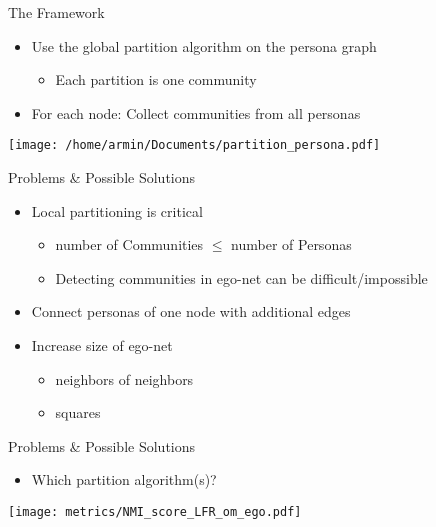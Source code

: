 \documentclass[11pt]{beamer}
\begin{document}
\begin{frame}{The Framework}
	
\begin{itemize}	
	\item Use the global partition algorithm on the persona graph
	\begin{itemize}
		\item Each partition is one community
	\end{itemize}
	\item For each node: Collect communities from all personas
	\end{itemize}
	\vfill
	\centering
	\texttt{[image: /home/armin/Documents/partition\_persona.pdf]}
\end{frame}

\begin{frame}{Problems \& Possible Solutions}
	\begin{itemize}
		\item Local partitioning is critical
		\begin{itemize}
			\item number of Communities $\leq$ number of Personas
			\item Detecting communities in ego-net can be difficult/impossible
		\end{itemize}
	
	\item Connect personas of one node with additional edges
	\item Increase size of ego-net
	\begin{itemize}
		\item neighbors of neighbors
		\item squares
	\end{itemize}
	\end{itemize}
\end{frame}

\begin{frame}{Problems \& Possible Solutions}
	\begin{itemize}
		\item Which partition algorithm(s)?
	\end{itemize}
	\centering
	\texttt{[image: metrics/NMI\_score\_LFR\_om\_ego.pdf]}
\end{frame}
\end{document}

